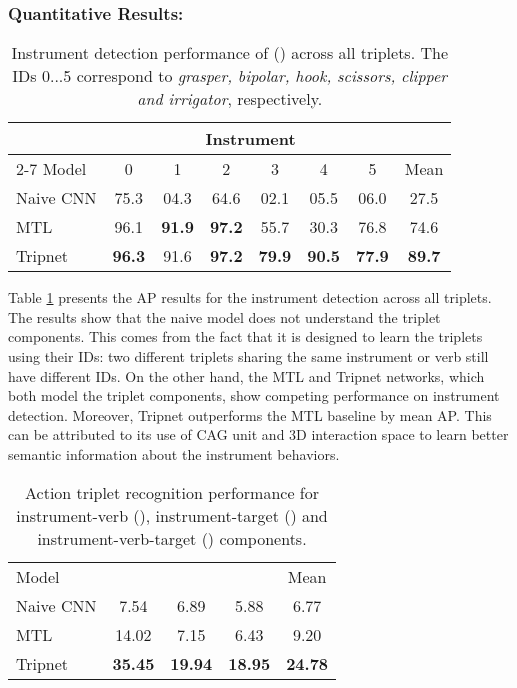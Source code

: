 \documentclass[english,runningheads,a4paper]{llncs}
\begin{document}
\subsubsection{Quantitative Results: }
\begin{table}[!htbp]
    \begin{center}
    \begin{tabular}{l|@{\hskip 0.05in}c@{\hskip 0.1in}c@{\hskip 0.1in}c@{\hskip 0.1in}c@{\hskip 0.1in}c@{\hskip 0.1in}c@{\hskip 0.1in}@{\hskip 0.001in}|c@{\hskip 0.1in}}
    \multirow{2}{*}{} & \multicolumn{6}{c|}{Instrument} & \multicolumn{1}{c}{} \\\cline{2-7}
    Model & 0 & 1 & 2 & 3 & 4 & 5 & Mean \\
    \hline
    Naive CNN    & 75.3 & 04.3 & 64.6 & 02.1 & 05.5 & 06.0 & 27.5  \\
    MTL          & 96.1 & \textbf{91.9} & \textbf{97.2} & 55.7 & 30.3 & 76.8 & 74.6  \\
    \hline
    Tripnet & \textbf{96.3} & 91.6 & \textbf{97.2} & \textbf{79.9} & \textbf{90.5} & \textbf{77.9} & \textbf{89.7}
    \end{tabular}
    \end{center}
    \caption{Instrument detection performance of () across all triplets. The IDs {0...5} correspond to {\it grasper, bipolar, hook, scissors, clipper and irrigator}, respectively.}
    \label{table:ap_i}
\end{table}

Table \ref{table:ap_i} presents the AP results for the instrument detection across all triplets. The results show that the naive model does not understand the triplet components. This comes from the fact that it is designed to learn the triplets using their IDs: two different triplets sharing the same instrument or verb still have different IDs. On the other hand, the MTL and Tripnet networks, which both model the triplet components, show competing performance on instrument detection. 
Moreover, Tripnet outperforms the MTL baseline by  mean AP. This can be attributed to its use of CAG unit and 3D interaction space to learn better semantic information about the instrument behaviors.

\begin{table}[!htbp]
    \begin{center}
    \begin{tabular}{l@{\hskip 0.1in}|@{\hskip 0.05in}c@{\hskip 0.1in}c@{\hskip 0.1in}c@{\hskip 0.1in}|c@{\hskip 0.1in}}
    Model &  &  &  & Mean \\
    \Xhline{1\arrayrulewidth}
    Naive CNN    & 7.54 & 6.89 & 5.88 & 6.77 \\
    MTL          & 14.02 & 7.15 & 6.43 & 9.20 \\
    \hline
    Tripnet & \textbf{35.45} & \textbf{19.94} & \textbf{18.95} & \textbf{24.78}
    \end{tabular}
    \end{center}
    \caption{Action triplet recognition performance for instrument-verb (), instrument-target () and instrument-verb-target () components.}
    \label{table:results_assoc}
\end{table}
\end{document}

